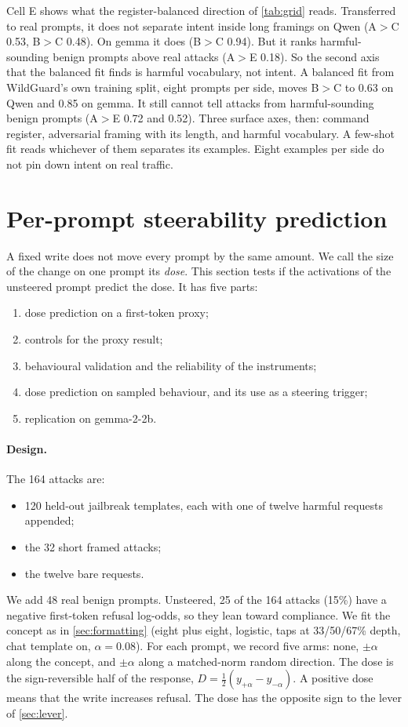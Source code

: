 \documentclass[11pt]{article}
\begin{document}
Cell E shows what the register-balanced direction of \cref{tab:grid} reads. Transferred to real prompts,
it does not separate intent inside long framings on Qwen (A$>$C 0.53, B$>$C 0.48). On gemma it does
(B$>$C 0.94). But it ranks harmful-sounding benign prompts above real attacks (A$>$E 0.18). So the second
axis that the balanced fit finds is harmful vocabulary, not intent. A balanced fit from WildGuard's own
training split, eight prompts per side, moves B$>$C to 0.63
on Qwen and 0.85 on gemma. It still cannot tell attacks from harmful-sounding benign prompts (A$>$E
0.72 and 0.52). Three surface axes, then: command register, adversarial framing with its length, and
harmful vocabulary. A few-shot fit reads whichever of them separates its examples. Eight examples per
side do not pin down intent on real traffic.

\section{Per-prompt steerability prediction}
\label{sec:dose}

A fixed write does not move every prompt by the same amount. We call the size of the change on one prompt
its \emph{dose}. This section tests if the activations of the unsteered prompt predict the dose. It has
five parts:
\begin{enumerate}[leftmargin=*]
  \item dose prediction on a first-token proxy;
  \item controls for the proxy result;
  \item behavioural validation and the reliability of the instruments;
  \item dose prediction on sampled behaviour, and its use as a steering trigger;
  \item replication on gemma-2-2b.
\end{enumerate}

\paragraph{Design.} The 164 attacks are:
\begin{itemize}[leftmargin=*]
  \item 120 held-out jailbreak templates, each with one of twelve harmful requests appended;
  \item the 32 short framed attacks;
  \item the twelve bare requests.
\end{itemize}
We add 48 real benign prompts. Unsteered, 25 of the 164 attacks (15\%) have a negative first-token refusal log-odds, so they lean
toward compliance. We fit the
concept as in \cref{sec:formatting} (eight plus eight, logistic, taps at 33/50/67\% depth, chat template
on, $\alpha=0.08$). For each prompt, we record five arms: none, $\pm\alpha$ along the concept, and
$\pm\alpha$ along a matched-norm random direction. The dose is the sign-reversible half of the response,
$D=\tfrac12(y_{+\alpha}-y_{-\alpha})$. A positive dose means that the write increases refusal. The dose
has the opposite sign to the lever of \cref{sec:lever}.
\end{document}
